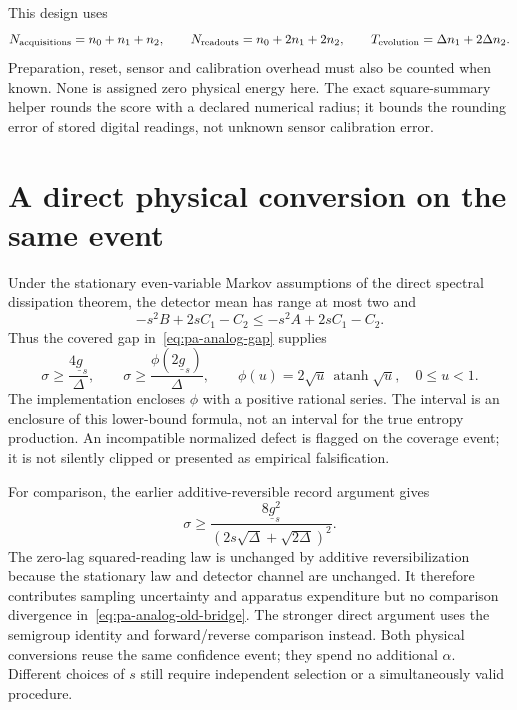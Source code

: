 This design uses
\[
 N_{\rm acquisitions}=n_0+n_1+n_2,\qquad
 N_{\rm readouts}=n_0+2n_1+2n_2,\qquad
 T_{\rm evolution}=\Delta n_1+2\Delta n_2.
\]
Preparation, reset, sensor and calibration overhead must also be counted when
known. None is assigned zero physical energy here. The exact square-summary
helper rounds the score with a declared numerical radius; it bounds the
rounding error of stored digital readings, not unknown sensor calibration
error.

\section{A direct physical conversion on the same event}
Under the stationary even-variable Markov assumptions of the direct spectral
dissipation theorem, the detector mean has range at most two and
\[
 -s^2B+2sC_1-C_2\leq -s^2A+2sC_1-C_2.
\]
Thus the covered gap in~\eqref{eq:pa-analog-gap} supplies
\begin{equation}
 \sigma\geq\frac{4\underline g_s}{\Delta},\qquad
 \sigma\geq\frac{\phi(2\underline g_s)}{\Delta},\qquad
 \phi(u)=2\sqrt u\,\operatorname{atanh}\sqrt u,
 \quad 0\leq u<1.
 \label{eq:pa-analog-direct-bridge}
\end{equation}
The implementation encloses $\phi$ with a positive rational series. The
interval is an enclosure of this lower-bound formula, not an interval for
the true entropy production. An incompatible normalized defect is flagged
on the coverage event; it is not silently clipped or presented as empirical
falsification.

For comparison, the earlier additive-reversible record argument gives
\begin{equation}
 \sigma\geq
 \frac{8\underline g_s^2}{(2s\sqrt\Delta+\sqrt{2\Delta})^2}.
 \label{eq:pa-analog-old-bridge}
\end{equation}
The zero-lag squared-reading law is unchanged by additive reversibilization
because the stationary law and detector channel are unchanged. It therefore
contributes sampling uncertainty and apparatus expenditure but no comparison
divergence in~\eqref{eq:pa-analog-old-bridge}. The stronger direct argument
uses the semigroup identity and forward/reverse comparison instead. Both
physical conversions reuse the same confidence event; they spend no additional
$\alpha$. Different choices of $s$ still require independent selection or a
simultaneously valid procedure.

